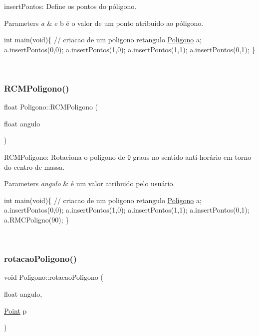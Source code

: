 insert\+Pontos\+: Define os pontos do póligono. 


\begin{DoxyParams}{Parameters}
{\em a} & e b é o valor de um ponto atribuido ao póligono. 
\begin{DoxyPre}
int main(void)\{
// criacao de um poligono retangulo
   \mbox{\hyperlink{class_poligono}{Poligono}} a;
   a.insertPontos(0,0);
   a.insertPontos(1,0);
   a.insertPontos(1,1);
   a.insertPontos(0,1);
\}
\end{DoxyPre}
 \\
\hline
\end{DoxyParams}
\mbox{\label{class_poligono_a61ad4f99fde11f7bb3077cd453152a95}} 
\subsubsection{\texorpdfstring{R\+C\+M\+Poligono()}{RCMPoligono()}}
{\footnotesize\ttfamily float Poligono\+::\+R\+C\+M\+Poligono (\begin{DoxyParamCaption}\item[{float}]{angulo }\end{DoxyParamCaption})}



R\+C\+M\+Poligono\+: Rotaciona o polígono de θ graus no sentido anti-\/horário em torno do centro de massa. 


\begin{DoxyParams}{Parameters}
{\em angulo} & é um valor atribuido pelo usuário. 
\begin{DoxyPre}
int main(void)\{
// criacao de um poligono retangulo
   \mbox{\hyperlink{class_poligono}{Poligono}} a;
   a.insertPontos(0,0);
   a.insertPontos(1,0);
   a.insertPontos(1,1);
   a.insertPontos(0,1);
   a.RMCPoligno(90);
\}
\end{DoxyPre}
 \\
\hline
\end{DoxyParams}
\mbox{\label{class_poligono_ac187000d9b4ee9a33b193ae5d67f09ac}} 
\subsubsection{\texorpdfstring{rotacao\+Poligono()}{rotacaoPoligono()}\hspace{0.1cm}{\footnotesize\ttfamily [1/2]}}
{\footnotesize\ttfamily void Poligono\+::rotacao\+Poligono (\begin{DoxyParamCaption}\item[{float}]{angulo,  }\item[{\mbox{\hyperlink{class_point}{Point}}}]{p }\end{DoxyParamCaption})}



